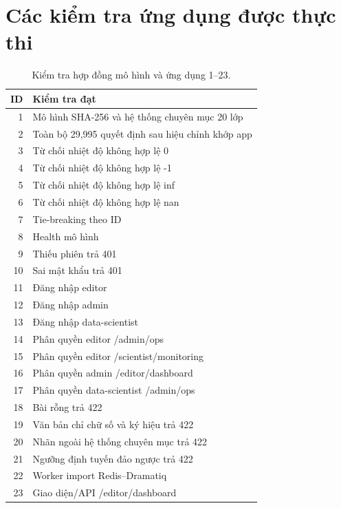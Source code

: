 \section{Các kiểm tra ứng dụng được thực thi}
\begin{table}[H]\centering\small\caption{Kiểm tra hợp đồng mô hình và ứng dụng 1--23.}
\begin{tabular}{r p{135mm}}\toprule ID & Kiểm tra đạt\\\midrule
1 & Mô hình SHA-256 và hệ thống chuyên mục 20 lớp\\
2 & Toàn bộ 29,995 quyết định sau hiệu chỉnh khớp app\\
3 & Từ chối nhiệt độ không hợp lệ 0\\
4 & Từ chối nhiệt độ không hợp lệ -1\\
5 & Từ chối nhiệt độ không hợp lệ inf\\
6 & Từ chối nhiệt độ không hợp lệ nan\\
7 & Tie-breaking theo ID\\
8 & Health mô hình\\
9 & Thiếu phiên trả 401\\
10 & Sai mật khẩu trả 401\\
11 & Đăng nhập editor\\
12 & Đăng nhập admin\\
13 & Đăng nhập data-scientist\\
14 & Phân quyền editor /admin/ops\\
15 & Phân quyền editor /scientist/monitoring\\
16 & Phân quyền admin /editor/dashboard\\
17 & Phân quyền data-scientist /admin/ops\\
18 & Bài rỗng trả 422\\
19 & Văn bản chỉ chữ số và ký hiệu trả 422\\
20 & Nhãn ngoài hệ thống chuyên mục trả 422\\
21 & Ngưỡng định tuyến đảo ngược trả 422\\
22 & Worker import Redis–Dramatiq\\
23 & Giao diện/API /editor/dashboard\\
\bottomrule\end{tabular}\end{table}
